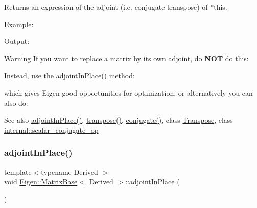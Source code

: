 \begin{DoxyReturn}{Returns}
an expression of the adjoint (i.\+e. conjugate transpose) of $\ast$this.
\end{DoxyReturn}
Example\+: 
\begin{DoxyCodeInclude}{0}
\end{DoxyCodeInclude}
 Output\+: 
\begin{DoxyVerbInclude}
\end{DoxyVerbInclude}


\begin{DoxyWarning}{Warning}
If you want to replace a matrix by its own adjoint, do {\bfseries{N\+OT}} do this\+: 
\begin{DoxyCode}{0}
\end{DoxyCode}
 Instead, use the \mbox{\hyperlink{class_eigen_1_1_matrix_base_a51c5982c1f64e45a939515b701fa6f4a}{adjoint\+In\+Place()}} method\+: 
\begin{DoxyCode}{0}
\end{DoxyCode}
 which gives Eigen good opportunities for optimization, or alternatively you can also do\+: 
\begin{DoxyCode}{0}
\end{DoxyCode}

\end{DoxyWarning}
\begin{DoxySeeAlso}{See also}
\mbox{\hyperlink{class_eigen_1_1_matrix_base_a51c5982c1f64e45a939515b701fa6f4a}{adjoint\+In\+Place()}}, \mbox{\hyperlink{class_eigen_1_1_dense_base_ac8952c19644a4ac7e41bea45c19b909c}{transpose()}}, \mbox{\hyperlink{class_eigen_1_1_matrix_base_a28ca7fb2f2140c1429492788a65ad741}{conjugate()}}, class \mbox{\hyperlink{class_eigen_1_1_transpose}{Transpose}}, class \mbox{\hyperlink{struct_eigen_1_1internal_1_1scalar__conjugate__op}{internal\+::scalar\+\_\+conjugate\+\_\+op}} 
\end{DoxySeeAlso}
\mbox{\label{class_eigen_1_1_matrix_base_a51c5982c1f64e45a939515b701fa6f4a}} 
\subsubsection{\texorpdfstring{adjointInPlace()}{adjointInPlace()}}
{\footnotesize\ttfamily template$<$typename Derived $>$ \\
void \mbox{\hyperlink{class_eigen_1_1_matrix_base}{Eigen\+::\+Matrix\+Base}}$<$ Derived $>$\+::adjoint\+In\+Place (\begin{DoxyParamCaption}{ }\end{DoxyParamCaption})\hspace{0.3cm}{\ttfamily [inline]}}

